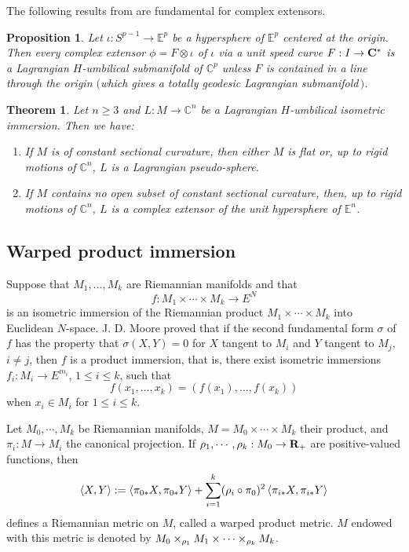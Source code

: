 \documentclass{amsart}
\theoremstyle{plain}
\newtheorem{theorem}{Theorem}[section]
\newtheorem{proposition}{Proposition}[section]
\numberwithin{equation}{section}
\theoremstyle{remark}
\numberwithin{equation}{section}
\begin{document}
The following results from \cite{c4.1} are fundamental for complex extensors.

\begin{proposition}\label{P:2.1}  Let $\iota:S^{p-1}\rightarrow \mathbb E^p$ be a hypersphere of $\mathbb E^p$ centered at the origin. Then every complex extensor $\phi=F\otimes \iota$ of $\iota$ via a unit speed curve $F:I\to \bf C^*$ is a Lagrangian $H$-umbilical submanifold of ${\mathbb C}^p$ unless $F$ is contained in a line through the origin $($which gives a totally geodesic Lagrangian submanifold$\,)$. \end{proposition}

\begin{theorem} Let $n\geq 3$ and $L: M\to {\mathbb C}^n$  be a Lagrangian $H$-umbilical isometric immersion. Then we have: 
\begin{enumerate}

\item If $M$ is of constant sectional curvature, then either $M$ is flat or, up to rigid motions of ${\mathbb C}^n$, $L$ is a Lagrangian pseudo-sphere.

\item If $M$ contains no open subset of constant sectional curvature, then,  up to rigid motions of ${\mathbb C}^n$, $L$ is a complex extensor of the unit hypersphere of ${\mathbb E}^n$.
\end{enumerate}\end{theorem}

\subsection{Warped product immersion}

Suppose that $M_1,\ldots,M_k$ are  Riemannian manifolds and that $$f:M_1\times\cdots\times M_k\to E^N$$ is an isometric immersion of the Riemannian product $M_1\times\cdots\times M_k$ into Euclidean $N$-space. J. D. Moore
\cite{moore}  proved that if the second fundamental form $\sigma$ of $f$ has the property that $\sigma(X,Y)=0$ for $X$  tangent to $M_i$ and $Y$ tangent to $M_j$, $i\ne j$, then $f$ is a product immersion, that is, there exist isometric immersions $f_i:M_i\to  E^{m_i},\, 1\leq i\leq k$, such that
\begin{equation}f(x_1,\ldots,x_k)=(f(x_1),\ldots,f(x_k))\end{equation}
when $x_i\in M_i$ for $1\leq i\leq k$.

 Let $M_0,\cdots ,M_k$ be Riemannian manifolds, $M=M_ 0 \times\cdots \times M_ k$ their product, and $\pi_i : M\to M_i$  the canonical projection. If $\rho_1,\cdots ,\rho_k : M_0\to \hbox{\bf R}_+$ are positive-valued functions, then 
\begin{equation}\left< X,Y \right>:= \left<\pi_{0*}X,\pi_{0*}Y\right> + \sum^k_{i=1} (\rho_i \circ\pi_0)^2 \left< \pi\sb {i*}X, \pi\sb {i*}Y\right>\end{equation} defines a Riemannian metric on $M$, called a warped product metric. $M$ endowed with this metric is denoted by $M_0 \times_{\rho_1} M_1 \times \cdots \times_{\rho\sb k}M_k$. 
\end{document}
